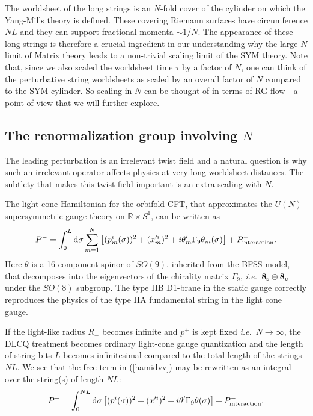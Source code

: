 \documentclass[nohyper,12pt,letterpaper]{JHEP3}
\def\IR{{\mathbb R}}
\def \eqref#1{(\ref{#1})}
\def \eqn#1#2{\begin{equation}#2\label{#1}\end{equation}}
\def \inte{{\mathrm{interaction}}}
\begin{document}
The worldsheet of the long strings is an $N$-fold cover of the cylinder on 
which the Yang-Mills theory is defined. These covering Riemann surfaces 
have circumference $NL$ and they can support fractional momenta $\sim 
1/N$. The appearance of these long strings is therefore a crucial 
ingredient in our understanding why the large $N$ limit of Matrix theory 
leads to a non-trivial scaling limit of the SYM theory.  Note that, since 
we also scaled the worldsheet time $\tau$ by a factor of $N$, one can 
think of the perturbative string worldsheets as scaled by an overall 
factor of $N$ compared to the SYM cylinder. So scaling in $N$ can be 
thought of in terms of RG flow---a point of view that we will further 
explore.

\subsection{The renormalization group involving $N$\label{nmarginal}}

The leading perturbation is an irrelevant twist field and a natural 
question is why such an irrelevant operator affects physics at very 
long worldsheet distances. The subtlety that makes this twist field 
important is an extra scaling with $N$.

The light-cone Hamiltonian for the orbifold CFT, that approximates
the $U(N)$ supersymmetric gauge theory on $\IR\times S^1$, can be written 
as
%
\eqn{hamidvv}{P^- = \int_0^L {\rm d}\sigma
\sum_{m=1}^N
\left[(p_m^i(\sigma))^2
+(x^{\prime i}_m)^2+i\theta'_m\Gamma_9\theta_m(\sigma)
\right]
+P^-_\inte.}
%
Here $\theta$ is a 16-component spinor of $SO(9)$, inherited from the
BFSS model, that decomposes into the eigenvectors of the chirality
matrix $\Gamma_9$, {\it i.e.}\ ${\bf 8_s}\oplus {\bf 8_c}$ under the
$SO(8)$ subgroup. The type IIB D1-brane in the static gauge correctly
reproduces the physics of the type IIA fundamental string in the light
cone gauge.

If the light-like radius $R_-$ becomes infinite and $p^+$ is kept
fixed {\it i.e.}\ $N\to\infty$, the DLCQ treatment becomes ordinary
light-cone gauge quantization and the length of string bits $L$
becomes infinitesimal compared to the total length of the strings
$NL$.  We see that the free term in \eqref{hamidvv} may be rewritten
as an integral over the string(s) of length $NL$:
%
\eqn{hamidvva}{P^- = \int_0^{NL} {\rm d}\sigma
\left[(p^i(\sigma))^2
+(x^{\prime i})^2+i\theta'\Gamma_9\theta(\sigma)
\right]
+P^-_\inte.}
\end{document}

